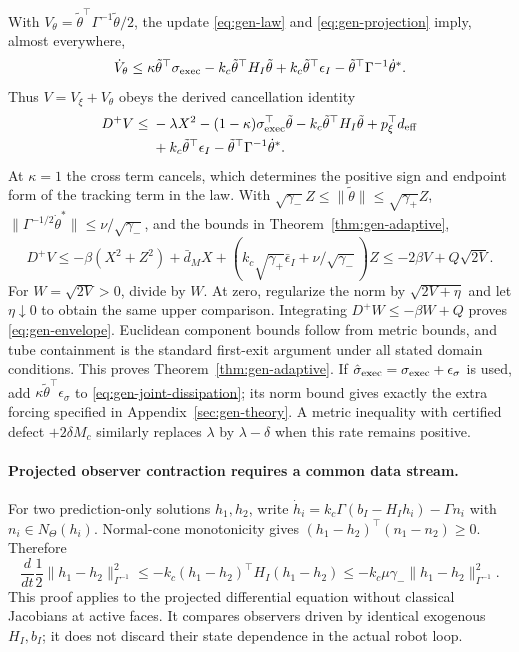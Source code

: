 With $V_\theta=\tilde\theta^\top\Gamma^{-1}\tilde\theta/2$, the update
\eqref{eq:gen-law} and \eqref{eq:gen-projection} imply, almost everywhere,
\begin{equation}
 \dot V_\theta\le\kappa\tilde\theta^\top\sigma_{\rm exec}
 -k_c\tilde\theta^\top H_I\tilde\theta
 +k_c\tilde\theta^\top\epsilon_I
 -\tilde\theta^\top\Gamma^{-1}\dot\theta^*.
 \label{eq:gen-parameter-proof}
\end{equation}
Thus $V=V_\xi+V_\theta$ obeys the derived cancellation identity
\begin{align}
 D^+V\le{}&-\lambda X^2-(1-\kappa)\sigma_{\rm exec}^\top\tilde\theta
 -k_c\tilde\theta^\top H_I\tilde\theta+p_\xi^\top d_{\rm eff}\nonumber\\
 &+k_c\tilde\theta^\top\epsilon_I
 -\tilde\theta^\top\Gamma^{-1}\dot\theta^*.
 \label{eq:gen-joint-dissipation}
\end{align}
At $\kappa=1$ the cross term cancels, which determines the positive sign
and endpoint form of the tracking term in the law. With
$\sqrt{\gamma_-}Z\le\|\tilde\theta\|\le\sqrt{\gamma_+}Z$,
$\|\Gamma^{-1/2}\dot\theta^*\|\le\nu/\sqrt{\gamma_-}$,
and the bounds in Theorem~\ref{thm:gen-adaptive},
\begin{equation}
 D^+V\le-\beta(X^2+Z^2)+\bar d_MX+
 \left(k_c\sqrt{\gamma_+}\bar\epsilon_I+\nu/\sqrt{\gamma_-}\right)Z
 \le-2\beta V+Q\sqrt{2V}.
 \label{eq:gen-V-bound}
\end{equation}
For $W=\sqrt{2V}>0$, divide by $W$. At zero, regularize the norm by
$\sqrt{2V+\eta}$ and let $\eta\downarrow0$ to obtain the same upper
comparison. Integrating $D^+W\le-\beta W+Q$ proves
\eqref{eq:gen-envelope}. Euclidean component bounds follow from metric
bounds, and tube containment is the standard first-exit argument under
all stated domain conditions. This proves Theorem~\ref{thm:gen-adaptive}.
If $\hat\sigma_{\rm exec}=\sigma_{\rm exec}+\epsilon_\sigma$ is used, add
$\kappa\tilde\theta^\top\epsilon_\sigma$ to
\eqref{eq:gen-joint-dissipation}; its norm bound gives exactly the extra
forcing specified in Appendix~\ref{sec:gen-theory}. A metric inequality
with certified defect $+2\delta M_c$ similarly replaces $\lambda$ by
$\lambda-\delta$ when this rate remains positive.

\paragraph{Projected observer contraction requires a common data stream.}
For two prediction-only solutions $h_1,h_2$, write
$\dot h_i=k_c\Gamma(b_I-H_Ih_i)-\Gamma n_i$ with
$n_i\in N_\Theta(h_i)$. Normal-cone monotonicity gives
$(h_1-h_2)^\top(n_1-n_2)\ge0$. Therefore
\begin{equation}
 \frac{d}{dt}\frac12\|h_1-h_2\|_{\Gamma^{-1}}^2
 \le-k_c(h_1-h_2)^\top H_I(h_1-h_2)
 \le-k_c\mu\gamma_-\|h_1-h_2\|_{\Gamma^{-1}}^2.
 \label{eq:projected-observer-contraction}
\end{equation}
This proof applies to the projected differential equation without
classical Jacobians at active faces. It compares observers driven by
identical exogenous $H_I,b_I$; it does not discard their state dependence
in the actual robot loop.

